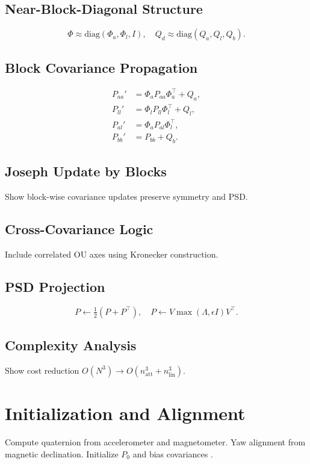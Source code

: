 \documentclass[10pt]{extarticle}
\begin{document}
\subsection{Near-Block-Diagonal Structure}
\[
\Phi \approx \mathrm{diag}(\Phi_a,\Phi_l,I),\quad
Q_d \approx \mathrm{diag}(Q_a,Q_l,Q_b).
\]

\subsection{Block Covariance Propagation}
\[
\begin{aligned}
P_{aa}' &= \Phi_a P_{aa}\Phi_a^\top + Q_a,\\
P_{ll}' &= \Phi_l P_{ll}\Phi_l^\top + Q_l,\\
P_{al}' &= \Phi_a P_{al}\Phi_l^\top,\\
P_{bb}' &= P_{bb}+Q_b.
\end{aligned}
\]

\subsection{Joseph Update by Blocks}
Show block-wise covariance updates preserve symmetry and PSD.

\subsection{Cross-Covariance Logic}
Include correlated OU axes using Kronecker construction.

\subsection{PSD Projection}
\[
P \leftarrow \tfrac12(P+P^\top),\quad
P \leftarrow V\max(\Lambda,\epsilon I)V^\top.
\]

\subsection{Complexity Analysis}
Show cost reduction $O(N^3)\to O(n_\text{att}^3+n_\text{lin}^3)$.

\section{Initialization and Alignment}
\label{sec:init}

Compute quaternion from accelerometer and magnetometer.
Yaw alignment from magnetic declination.
Initialize $P_0$ and bias covariances
\cite{crassidis2012}.
\end{document}
